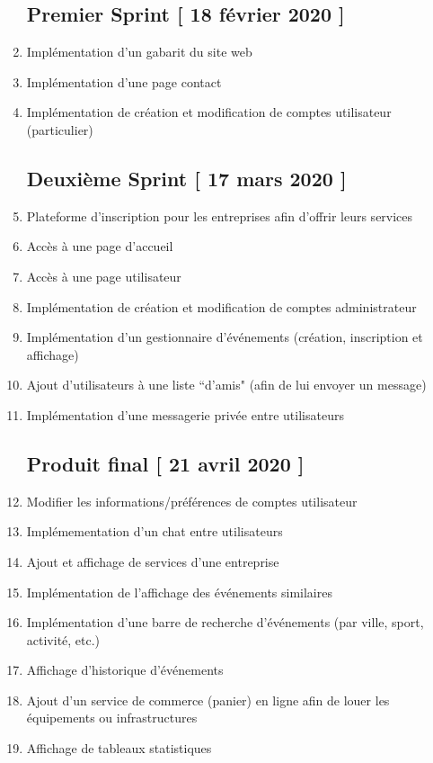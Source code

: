 \documentclass[letter,12pt]{exam}
\begin{document}
\begin{enumerate}

\subsection{Premier Sprint {[} 18 février 2020
{]}}\label{premier-sprint-18-fevrier-2020}


\tightlist
\item
  Implémentation d'un gabarit du site web
\item
  Implémentation d'une page contact
\item
  Implémentation de création et modification de comptes utilisateur
  (particulier)

\subsection{Deuxième Sprint {[} 17 mars 2020
{]}}\label{deuxieme-sprint-17-mars-2020}

\item
  Plateforme d'inscription pour les entreprises afin d'offrir leurs
  services
\item
  Accès à une page d'accueil
\item
  Accès à une page utilisateur
\item
  Implémentation de création et modification de comptes administrateur
\item
  Implémentation d'un gestionnaire d'événements (création, inscription et
  affichage)
\item
  Ajout d'utilisateurs à une liste ``d'amis" (afin de lui envoyer un message)
\item
  Implémentation d'une messagerie privée entre utilisateurs


\subsection{Produit final {[} 21 avril 2020
{]}}\label{produit-final-21-avril-2020}


\item
  Modifier les informations/préférences de comptes utilisateur
\item
  Implémementation d'un chat entre utilisateurs
\item
  Ajout et affichage de services d'une entreprise
\item
  Implémentation de l'affichage des événements similaires
\item
  Implémentation d'une barre de recherche d'événements (par ville,
  sport, activité, etc.)
\item
  Affichage d'historique d'événements
\item
  Ajout d'un service de commerce (panier) en ligne afin de louer les équipements ou infrastructures
\item
  Affichage de tableaux statistiques
\end{enumerate}
\end{document}
